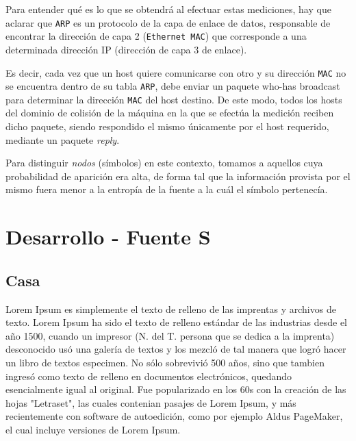 \documentclass[final,narroweqnarray,inline]{ieee}
\begin{document}
\medskip

Para entender qué es lo que se obtendrá al efectuar estas mediciones,
hay que aclarar que \texttt{ARP} es un protocolo de la capa de enlace
de datos, responsable de encontrar la dirección de capa 2
(\texttt{Ethernet MAC}) que corresponde a una determinada dirección IP
(dirección de capa 3 de enlace).

Es decir, cada vez que un host quiere comunicarse con otro y su
dirección \texttt{MAC} no se encuentra dentro de su tabla
\texttt{ARP}, debe enviar un paquete who-has broadcast para determinar
la dirección \texttt{MAC} del host destino. De este modo, todos los
hosts del dominio de colisión de la máquina en la que se efectúa la
medición reciben dicho paquete, siendo respondido el mismo únicamente
por el host requerido, mediante un paquete \emph{reply}.

Para distinguir \emph{nodos} (símbolos) en este contexto, tomamos a
aquellos cuya probabilidad de aparición era alta, de forma tal que la
información provista por el mismo fuera menor a la entropía de la
fuente a la cuál el símbolo pertenecía.

\section{Desarrollo - Fuente S}
  \subsection{Casa}

Lorem Ipsum es simplemente el texto de relleno de las imprentas y archivos de texto. Lorem Ipsum ha sido el texto de relleno estándar de las industrias desde el año 1500, cuando un impresor (N. del T. persona que se dedica a la imprenta) desconocido usó una galería de textos y los mezcló de tal manera que logró hacer un libro de textos especimen. No sólo sobrevivió 500 años, sino que tambien ingresó como texto de relleno en documentos electrónicos, quedando esencialmente igual al original. Fue popularizado en los 60s con la creación de las hojas "Letraset", las cuales contenian pasajes de Lorem Ipsum, y más recientemente con software de autoedición, como por ejemplo Aldus PageMaker, el cual incluye versiones de Lorem Ipsum.
\end{document}
